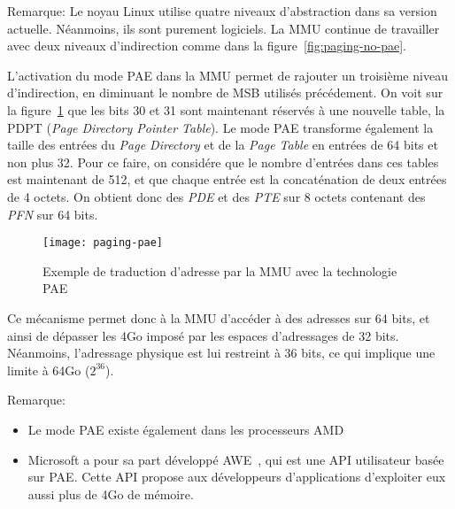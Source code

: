      \begin{paragraph}{Remarque:}
        Le noyau Linux utilise quatre niveaux d'abstraction dans sa version
        actuelle. Néanmoins, ils sont purement logiciels. La MMU continue de
        travailler avec deux niveaux d'indirection comme dans la
        figure~\ref{fig:paging-no-pae}.\\
      \end{paragraph}
      
      L'activation du mode PAE dans la MMU permet de rajouter un troisième
      niveau d'indirection, en diminuant le nombre de MSB utilisés
      précédement. On voit sur la figure~\ref{fig:paging-pae} que les bits 30 et
      31 sont maintenant réservés à une nouvelle table, la PDPT (\textit{Page
        Directory Pointer Table}). Le mode PAE transforme également la taille
      des entrées du \textit{Page Directory} et de la \textit{Page Table} en
      entrées de 64 bits et non plus 32. Pour ce faire, on considére que le
      nombre d'entrées dans ces tables est maintenant de 512, et que chaque
      entrée est la concaténation de deux entrées de 4 octets. On obtient donc
      des \textit{PDE} et des \textit{PTE} sur 8 octets contenant des
      \textit{PFN} sur 64 bits.

      \begin{figure}[ht]
        \centering \texttt{[image: paging-pae]}
        \caption{Exemple de traduction d'adresse par la MMU avec la technologie
          PAE}
        \label{fig:paging-pae}
      \end{figure}
      
      Ce mécanisme permet donc à la MMU d'accéder à des adresses sur 64 bits, et
      ainsi de dépasser les 4Go imposé par les espaces d'adressages de 32
      bits. Néanmoins, l'adressage physique est lui restreint à 36 bits, ce qui
      implique une limite à 64Go ($2^{36}$).

      \begin{paragraph}{Remarque:}
        \begin{itemize}
          \item Le mode PAE existe également dans les processeurs
            AMD~\citep{amd2000system}
          \item Microsoft a pour sa part développé
            AWE~\citep{russinovich2012windows}, qui est une API utilisateur
            basée sur PAE. Cette API propose aux développeurs d'applications
            d'exploiter eux aussi plus de 4Go de mémoire.
        \end{itemize}
      \end{paragraph}


